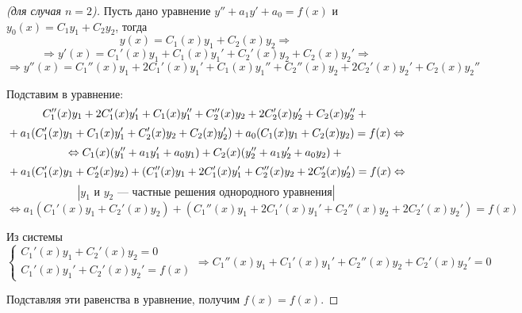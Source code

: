 \begin{proof}[(для случая $n = 2$)]
Пусть дано уравнение $y'' + a_1 y' + a_0 = f(x)$ и $y_0(x) = C_1 y_1 + C_2 y_2$, тогда
\begin{equation*}
y(x) = C_1(x) y_1 + C_2(x) y_2 \Rightarrow
\end{equation*}
\begin{equation*}
\Rightarrow y'(x) = C_1'(x) y_1 + C_1(x) y_1' + C_2'(x) y_2 + C_2(x) y_2' \Rightarrow
\end{equation*}
\begin{equation*}
\Rightarrow y''(x) = C_1''(x) y_1 + 2 C_1'(x) y_1' + C_1(x) y_1'' +
C_2''(x) y_2 + 2 C_2'(x) y_2' + C_2(x) y_2''
\end{equation*}

Подставим в уравнение:
\begin{equation*}
C_1''(x) y_1 + 2 C_1'(x) y_1' + C_1(x) y_1'' +
C_2''(x) y_2 + 2 C_2'(x) y_2' + C_2(x) y_2'' + \vphantom{1}
\end{equation*}
\begin{equation*}
\vphantom{1} + a_1 (C_1'(x) y_1 + C_1(x) y_1' + C_2'(x) y_2 + C_2(x) y_2') +
a_0 (C_1(x) y_1 + C_2(x) y_2) = f(x) \Leftrightarrow
\end{equation*}
\begin{equation*}
\Leftrightarrow C_1(x) (y_1'' + a_1 y_1' + a_0 y_1) +
C_2(x) (y_2'' + a_1 y_2' + a_0 y_2) + \vphantom{1}
\end{equation*}
\begin{equation*}
\vphantom{1} + a_1 (C_1'(x) y_1 + C_2'(x) y_2) +
(C_1''(x) y_1 + 2 C_1'(x) y_1' + C_2''(x) y_2 + 2 C_2'(x) y_2') = f(x) \Leftrightarrow
\end{equation*}
\begin{equation*}
\left| \text{$y_1$ и $y_2$~--- частные решения однородного уравнения} \right|
\end{equation*}
\begin{equation*}
\Leftrightarrow a_1 (C_1'(x) y_1 + C_2'(x) y_2) +
(C_1''(x) y_1 + 2 C_1'(x) y_1' + C_2''(x) y_2 + 2 C_2'(x) y_2') = f(x)
\end{equation*}

Из системы
\begin{equation*}
\begin{cases}
C_1'(x) y_1 + C_2'(x) y_2 = 0 \\
C_1'(x) y_1' + C_2'(x) y_2' = f(x)
\end{cases}
\Rightarrow C_1''(x) y_1 + C_1'(x) y_1' + C_2''(x) y_2 + C_2'(x) y_2' = 0
\end{equation*}

Подставляя эти равенства в уравнение, получим $f(x) = f(x)$.
\end{proof}


